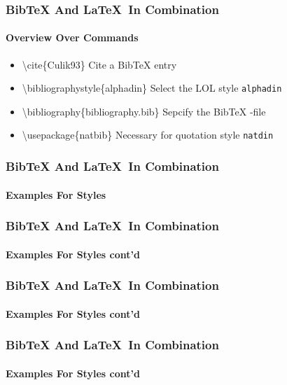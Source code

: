 \begin{frame}
\frametitle{BibTeX And \LaTeX ~In Combination}
\framesubtitle{Overview Over Commands}
\begin{itemize}

\item \color{nounibaredI}\textbackslash cite\color{black}\{Culik93\} \hfill Cite a BibTeX entry\\

\item \color{nounibaredI}\textbackslash bibliographystyle\color{black}\{alphadin\} \hfill Select the LOL style \glqq \texttt{alphadin}\grqq\\

\item \color{nounibaredI}\textbackslash bibliography\color{black}\{bibliography.bib\} \hfill Sepcify the  BibTeX -file\\

\item \color{nounibaredI}\textbackslash usepackage\color{black}\{natbib\} \hfill Necessary for quotation style \texttt{natdin}\\


\end{itemize}


\end{frame}


\begin{frame}
\frametitle{BibTeX And \LaTeX ~In Combination}
\framesubtitle{Examples For Styles}
\end{frame}


\begin{frame}
\frametitle{BibTeX And \LaTeX ~In Combination}
\framesubtitle{Examples For Styles cont'd}
\end{frame}

\begin{frame}
\frametitle{BibTeX And \LaTeX ~In Combination}
\framesubtitle{Examples For Styles cont'd}
\end{frame}


\begin{frame}
\frametitle{BibTeX And \LaTeX ~In Combination}
\framesubtitle{Examples For Styles cont'd}
\end{frame}